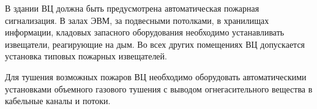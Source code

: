 В здании ВЦ должна быть предусмотрена автоматическая пожарная сигнализация. В залах ЭВМ, за подвесными потолками, в хранилищах информации, кладовых запасного оборудования необходимо устанавливать извещатели, реагирующие на дым. Во всех других помещениях ВЦ допускается установка типовых пожарных извещателей.

Для тушения возможных пожаров ВЦ необходимо оборудовать автоматическими установками объемного газового тушения с выводом огнегасительного вещества в кабельные каналы и потоки.

